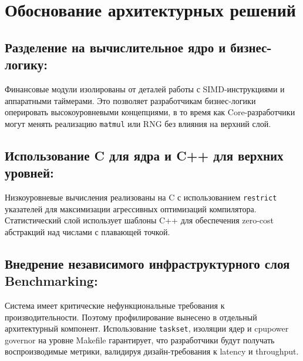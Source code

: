 \documentclass[12pt]{extarticle}
\begin{document}
\section{Обоснование архитектурных решений}

\subsection{Разделение на вычислительное ядро и бизнес-логику:}
Финансовые модули изолированы от деталей работы с SIMD-инструкциями и аппаратными таймерами. Это позволяет разработчикам бизнес-логики оперировать высокоуровневыми концепциями, в то время как Core-разработчики могут менять реализацию \texttt{matmul} или RNG без влияния на верхний слой.

\subsection{Использование C для ядра и C++ для верхних уровней:}
Низкоуровневые вычисления реализованы на C с использованием \texttt{restrict} указателей для максимизации агрессивных оптимизаций компилятора. Статистический слой использует шаблоны C++ для обеспечения zero-cost абстракций над числами с плавающей точкой.

\subsection{Внедрение независимого инфраструктурного слоя Benchmarking:}
Система имеет критические нефункциональные требования к производительности. Поэтому профилирование вынесено в отдельный архитектурный компонент. Использование \texttt{taskset}, изоляции ядер и cpupower governor на уровне Makefile гарантирует, что разработчики будут получать воспроизводимые метрики, валидируя дизайн-требования к latency и throughput.
\end{document}
